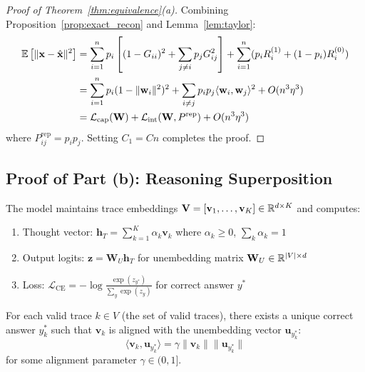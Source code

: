\begin{proof}[Proof of Theorem~\ref{thm:equivalence}(a)]
Combining Proposition~\ref{prop:exact_recon} and Lemma~\ref{lem:taylor}:
\begin{align}
\mathbb{E}\left[\|\mathbf{x} - \hat{\mathbf{x}}\|^2\right] &= \sum_{i=1}^n p_i \left[ (1-G_{ii})^2 + \sum_{j \neq i} p_j G_{ij}^2 \right] + \sum_{i=1}^n (p_i R_i^{(1)} + (1-p_i)R_i^{(0)}) \\
&= \sum_{i=1}^n p_i (1-\|\mathbf{w}_i\|^2)^2 + \sum_{i \neq j} p_i p_j \langle \mathbf{w}_i, \mathbf{w}_j \rangle^2 + O(n^3 \eta^3) \\
&= \mathcal{L}_{\text{cap}}(\mathbf{W}) + \mathcal{L}_{\text{int}}(\mathbf{W}, P^{\text{rep}}) + O(n^3 \eta^3)
\end{align}
where $P^{\text{rep}}_{ij} = p_i p_j$. Setting $C_1 = Cn$ completes the proof.
\end{proof}

\subsection{Proof of Part (b): Reasoning Superposition}

\begin{assumption}
\label{asm:continuous_thought}
The model maintains trace embeddings $\mathbf{V} = [\mathbf{v}_1, \ldots, \mathbf{v}_K] \in \mathbb{R}^{d \times K}$ and computes:
\begin{enumerate}
    \item[(i)] Thought vector: $\mathbf{h}_T = \sum_{k=1}^K \alpha_k \mathbf{v}_k$ where $\alpha_k \geq 0$, $\sum_k \alpha_k = 1$
    \item[(ii)] Output logits: $\mathbf{z} = \mathbf{W}_U \mathbf{h}_T$ for unembedding matrix $\mathbf{W}_U \in \mathbb{R}^{|V| \times d}$
    \item[(iii)] Loss: $\mathcal{L}_{\text{CE}} = -\log \frac{\exp(z_{y^*})}{\sum_y \exp(z_y)}$ for correct answer $y^*$
\end{enumerate}
\end{assumption}

\begin{assumption}
\label{asm:alignment}
For each valid trace $k \in V$ (the set of valid traces), there exists a unique correct answer $y_k^*$ such that $\mathbf{v}_k$ is aligned with the unembedding vector $\mathbf{u}_{y_k^*}$:
\begin{equation}
\langle \mathbf{v}_k, \mathbf{u}_{y_k^*} \rangle = \gamma \|\mathbf{v}_k\| \|\mathbf{u}_{y_k^*}\|
\end{equation}
for some alignment parameter $\gamma \in (0, 1]$.
\end{assumption}

